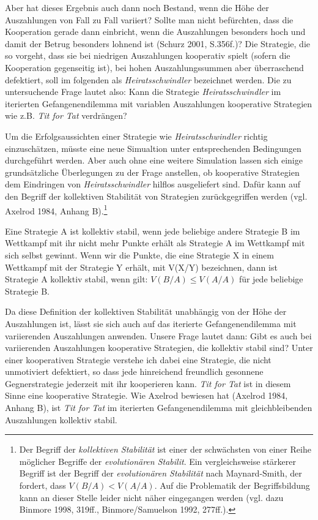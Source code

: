 \documentclass[12pt,a4paper,ngerman]{article}
\begin{document}
Aber hat dieses Ergebnis auch dann noch Bestand, wenn die Höhe der
Auszahlungen von Fall zu Fall variiert? Sollte man nicht befürchten, dass die
Kooperation gerade dann einbricht, wenn die Auszahlungen besonders hoch und
damit der Betrug besonders lohnend ist (Schurz 2001, S.356f.)? Die Strategie,
die so vorgeht, dass sie bei niedrigen Auszahlungen kooperativ spielt (sofern
die Kooperation gegenseitig ist), bei hohen Auszahlungssummen aber
überraschend defektiert, soll im folgenden als {\em Heiratsschwindler}
bezeichnet werden. Die zu untersuchende Frage lautet also: Kann die Strategie
{\em Heiratsschwindler} im iterierten Gefangenendilemma mit variablen
Auszahlungen kooperative Strategien wie z.B. {\em Tit for Tat} verdrängen?

Um die Erfolgsaussichten einer Strategie wie {\em Heiratsschwindler}
richtig einzuschätzen, müsste eine neue Simualtion unter
entsprechenden Bedingungen durchgeführt werden. Aber auch ohne eine
weitere Simulation lassen sich einige grundsätzliche Überlegungen zu
der Frage anstellen, ob kooperative Strategien dem Eindringen von {\em
  Heiratsschwindler} hilflos ausgeliefert sind. Dafür kann auf den
Begriff der kollektiven Stabilität von Strategien zurückgegriffen
werden (vgl. Axelrod 1984, Anhang B).\footnote{Der Begriff der {\em
    kollektiven Stabilität} ist einer der schwächsten von einer Reihe
  möglicher Begriffe der {\em evolutionären Stabilit}. Ein
  vergleichsweise stärkerer Begriff ist der Begriff der {\em
    evolutionären Stabilität} nach Maynard-Smith, der fordert, dass
  $V(B/A) < V(A/A)$. Auf die Problematik der Begriffsbildung kann an
  dieser Stelle leider nicht näher eingegangen werden (vgl. dazu
  Binmore 1998, 319ff., Binmore/Samuelson 1992, 277ff.).}

Eine Strategie A ist kollektiv stabil, wenn jede beliebige andere Strategie B
im Wettkampf mit ihr nicht mehr Punkte erhält als Strategie A im Wettkampf mit
sich selbst gewinnt. Wenn wir die Punkte, die eine Strategie X in einem
Wettkampf mit der Strategie Y erhält, mit V(X/Y) bezeichnen, dann ist
Strategie A kollektiv stabil, wenn gilt: $V(B/A) \le V(A/A)$ für jede beliebige
Strategie B.

Da diese Definition der kollektiven Stabilität unabhängig von der Höhe der
Auszahlungen ist, lässt sie sich auch auf das iterierte Gefangenendilemma mit
variierenden Auszahlungen anwenden. Unsere Frage lautet dann: Gibt es auch bei
variierenden Auszahlungen kooperative Strategien, die kollektiv stabil sind?
Unter einer kooperativen Strategie verstehe ich dabei eine Strategie, die
nicht unmotiviert defektiert, so dass jede hinreichend freundlich gesonnene
Gegnerstrategie jederzeit mit ihr kooperieren kann. {\em Tit for Tat} ist in
diesem Sinne eine kooperative Strategie. Wie Axelrod bewiesen hat
(Axelrod 1984, Anhang B), ist {\em Tit for Tat} im iterierten
Gefangenendilemma mit gleichbleibenden Auszahlungen kollektiv stabil.
\end{document}
